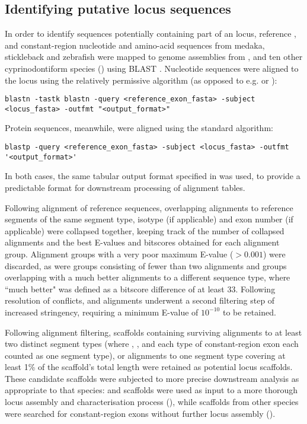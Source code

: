 \subsection{Identifying putative locus sequences}
\label{sec:locus_scaffolds}

In order to identify sequences potentially containing part of an \igh{} locus, reference \vh, \jh and constant-region nucleotide and amino-acid sequences from medaka, stickleback and zebrafish were mapped to genome assemblies from \Nfu, \Xma and ten other cyprinodontiform species () using BLAST \parencite{altschul1990blast,altschul1997blast}. Nucleotide sequences were aligned to the locus using the relatively permissive  algorithm (as opposed to e.g.  or ):

\begin{lstlisting}
blastn -tastk blastn -query <reference_exon_fasta> -subject <locus_fasta> -outfmt "<output_format>"
\end{lstlisting}

Protein sequences, meanwhile, were aligned using the standard  algorithm:

\begin{lstlisting}
blastp -query <reference_exon_fasta> -subject <locus_fasta> -outfmt '<output_format>'
\end{lstlisting}

In both cases, the same tabular output format specified in  was used, to provide a predictable format for downstream processing of  alignment tables.

Following alignment of reference sequences, overlapping alignments to reference segments of the same segment type, isotype (if applicable) and exon number (if applicable) were collapsed together, keeping track of the number of collapsed alignments and the best E-values and bitscores obtained for each alignment group. Alignment groups with a very poor maximum E-value ($> 0.001$) were discarded, as were groups consisting of fewer than two alignments and groups overlapping with a much better alignments to a different sequence type, where ``much better" was defined as a bitscore difference of at least 33. Following resolution of conflicts, \vh and \ch alignments underwent a second filtering step of increased stringency, requiring a minimum E-value of $10^{-10}$ to be retained. 

Following alignment filtering, scaffolds containing surviving alignments to at least two distinct segment types (where \vh, \jh, and each type of constant-region exon each counted as one segment type), or alignments to one segment type covering at least 1\% of the scaffold's total length were retained as potential locus scaffolds. These candidate scaffolds were subjected to more precise downstream analysis as appropriate to that species: \Nfu and \Xma scaffolds were used as input to a more thorough locus assembly and characterisation process (), while scaffolds from other species were searched for constant-region exons without further locus assembly ().


